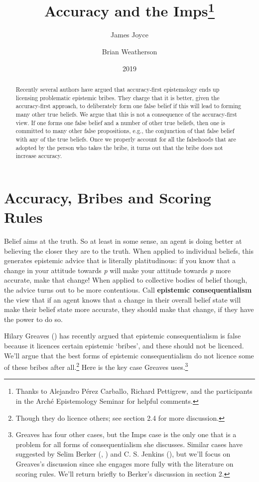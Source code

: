 \documentclass[
  10pt,
  letterpaper,
  DIV=11,
  numbers=noendperiod,
  twoside]{scrartcl}
\title{Accuracy and the Imps\thanks{Thanks to Alejandro Pérez Carballo,
Richard Pettigrew, and the participants in the Arché Epistemology
Seminar for helpful comments.}}
\author{James Joyce \and Brian Weatherson}
\date{2019}
\begin{document}
\maketitle
\begin{abstract}
Recently several authors have argued that accuracy-first epistemology
ends up licensing problematic epistemic bribes. They charge that it is
better, given the accuracy-first approach, to deliberately form one
false belief if this will lead to forming many other true beliefs. We
argue that this is not a consequence of the accuracy-first view. If one
forms one false belief and a number of other true beliefs, then one is
committed to many other false propositions, e.g., the conjunction of
that false belief with any of the true beliefs. Once we properly account
for all the falsehoods that are adopted by the person who takes the
bribe, it turns out that the bribe does not increase accuracy.
\end{abstract}

\section{Accuracy, Bribes and Scoring
Rules}\label{accuracybribesandscoringrules}

Belief aims at the truth. So at least in some sense, an agent is doing
better at believing the closer they are to the truth. When applied to
individual beliefs, this generates epistemic advice that is literally
platitudinous: if you know that a change in your attitude towards
\emph{p} will make your attitude towards \emph{p} more accurate, make
that change! When applied to collective bodies of belief though, the
advice turns out to be more contentious. Call \textbf{epistemic
consequentialism} the view that if an agent knows that a change in their
overall belief state will make their belief state more accurate, they
should make that change, if they have the power to do so.

Hilary Greaves () has recently argued
that epistemic consequentialism is false because it licences certain
epistemic `bribes', and these should not be licenced. We'll argue that
the best forms of epistemic consequentialism do not licence some of
these bribes after all.\footnote{Though they do licence others; see
  section 2.4 for more discussion.} Here is the key case Greaves
uses.\footnote{Greaves has four other cases, but the Imps case is the
  only one that is a problem for all forms of consequentialism she
  discusses. Similar cases have suggested by Selim Berker
  (, )
  and C. S. Jenkins (), but we'll focus
  on Greaves's discussion since she engages more fully with the
  literature on scoring rules. We'll return briefly to Berker's
  discussion in section 2.}
\end{document}
